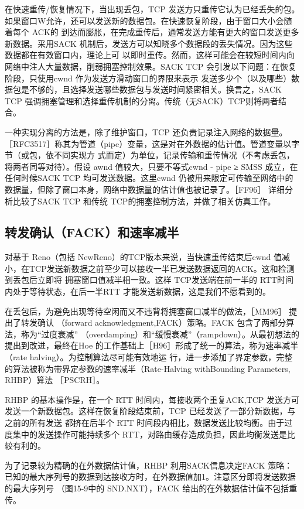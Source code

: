 在快速重传/恢复情况下，当出现丢包，TCP 发送方只重传它认为已经丢失的包。如果窗口W允许，还可以发送新的数据包。在快速恢复阶段，由于窗口大小会随着每个 ACK的
到达而膨胀，在完成重传后，通常发送方能有更大的窗口发送更多新数据。采用SACK 机制后，发送方可以知晓多个数据段的丢失情况。因为这些数据都在有效窗口内，理论上可
以即时重传。然而，这样可能会在较短时间内向网络中注人大量数据，削弱拥塞控制效果。SACK TCP 会引发以下问题：在恢复阶段，只使用cwnd 作为发送方滑动窗口的界限来表示
发送多少个（以及哪些）数据包是不够的，且选择发送哪些数据包与发送时间紧密相关。换言之，SACK TCP 强调拥塞管理和选择重传机制的分离。传统（无SACK）TCP则将两者结合。

一种实现分离的方法是，除了维护窗口，TCP 还负责记录注入网络的数据量。［RFC3517］称其为管道（pipe）变量，这是对在外数据的估计值。管道变量以字节（或包，依不同实现方
式而定）为单位，记录传输和重传情况（不考虑丢包，将两者同等对待）。假设 awnd 值较大，只要不等式cwnd - pipe ≥ SMSS 成立，在任何时候SACK TCP 均可发送数据。这里cwnd
仍被用来限定可传输至网络中的数据量，但除了窗口本身，网络中数据量的估计值也被记录了。［FF96］ 详细分析比较了SACK TCP 和传统 TCP的拥塞控制方法，并做了相关仿真工作。

\subsection{转发确认（FACK）和速率减半}
对基于 Reno（包括 NewReno）的TCP版本来说，当快速重传结束后cwnd 值减小，在TCP发送新数据之前至少可以接收一半已发送数据返回的ACK。这和检测到丢包后立即将
拥塞窗口值减半相一致。这样 TCP发送端在前一半的 RTT时间内处于等待状态，在后一半RTT 才能发送新数据，这是我们不愿看到的。

在丢包后，为避免出现等待空闲而又不违背将拥塞窗口减半的做法，［MM96］ 提出了转发确认 （forward acknowledgment,FACK）策略。FACK 包含了两部分算法，称为“过度衰减”
（overdamping）和“缓慢衰减”（rampdown）。从最初想法的提出到改进，最终在Hoe 的工作基础上［H96］形成了统一的算法，称为速率减半（rate halving）。为控制算法尽可能有效地运
行，进一步添加了界定参数，完整的算法被称为带界定参数的速率减半（Rate-Halving withBounding Parameters, RHBP）算法 ［PSCRH］。

RHBP 的基本操作是，在一个 RTT 时间内，每接收两个重复ACK,TCP 发送方可发送一个新数据包。这样在恢复阶段结束前，TCP 已经发送了一部分新数据，与之前的所有发送
都挤在后半个 RTT 时间段内相比，数据发送比较均衡。由于过度集中的发送操作可能持续多个 RTT，对路由缓存造成负担，因此均衡发送是比较有利的。

为了记录较为精确的在外数据估计值，RHBP 利用SACK信息决定FACK 策略：已知的最大序列号的数据到达接收方时，在外数据值加1。注意区分即将发送数据的最大序列号
（图15-9中的 SND.NXT），FACK 给出的在外数据估计值不包括重传。

